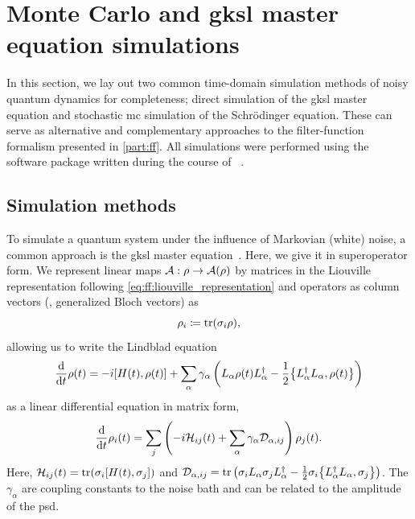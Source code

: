 \section{Monte Carlo and \texorpdfstring{\acrshort{gksl}}{GKSL} master equation simulations}\label{sec:app:ff:time_domain_methods}
In this section, we lay out two common time-domain simulation methods of noisy quantum dynamics for completeness; direct simulation of the \gls{gksl} master equation and stochastic \gls{mc} simulation of the Schrödinger equation.
These can serve as alternative and complementary approaches to the filter-function formalism presented in \cref{part:ff}.
All simulations were performed using the  software package written during the course of \thethesis~\cite{Hangleiter_lmt}.

\subsection{Simulation methods}\label{subsec:app:ff:time_domain_methods:methods}
To simulate a quantum system under the influence of Markovian (white) noise, a common approach is the \gls{gksl} master equation~\cite{Lindblad1976,Gorini1976}.
Here, we give it in superoperator form.
We represent linear maps $\mathcal{A}: \rho\rightarrow\mathcal{A}(\rho)$ by matrices in the Liouville representation following \cref{eq:ff:liouville_representation}
and operators as column vectors (\ie, generalized Bloch vectors) as
\begin{equation}\label{eq:app:ff:bloch_vector}
    \rho_i \coloneqq \tr(\sigma_i\rho),
\end{equation}
allowing us to write the Lindblad equation
\begin{equation}\label{eq:app:ff:lindblad:hilbert}
    \dv{t}\rho(t) = -\i\comm{H(t)}{\rho(t)} + \sum_\alpha \gamma_\alpha\left(L_\alpha\rho(t) L_\alpha\adjoint - \frac{1}{2}\acomm{L_\alpha\adjoint L_\alpha}{\rho(t)}\right)
\end{equation}
as a linear differential equation in matrix form,
\begin{equation}\label{eq:app:ff:lindlbad:liouville}
    \dv{t}\rho_i(t) = \sum_j\left(-i\mathcal{H}_{ij}(t)+ \sum_\alpha \gamma_\alpha \mathcal{D}_{\alpha, ij}\right)\rho_j(t).
\end{equation}
Here, $\mc{H}_{ij}(t) = \tr(\sigma_i\comm{H(t)}{\sigma_j})$ and $\mc{D}_{\alpha, ij} = \tr\left(\sigma_i L_\alpha\sigma_j L_\alpha\adjoint - \frac{1}{2}\sigma_i \acomm{L_\alpha\adjoint L_\alpha}{\sigma_j}\right)$.
The $\gamma_\alpha$ are coupling constants to the noise bath and can be related to the amplitude of the \gls{psd}.

